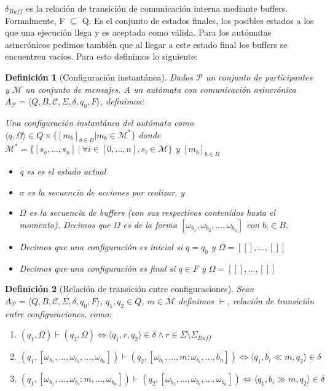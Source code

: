 \documentclass[paper=a4, fontsize=11pt, spanish]{scrartcl} %
\numberwithin{equation}{section} %
\numberwithin{figure}{section} %
\numberwithin{table}{section} %
\newtheorem{definition}{Definición}
\begin{document}
$\delta_{Buff}$ es la relación de transición de comunicación interna mediante buffers.\\

Formalmente, F $\subseteq$ Q. Es el conjunto de estados finales, los posibles estados a los que una ejecución llega y es aceptada como válida. Para los autómatas asincrónicos pedimos también que al llegar a este estado final los buffers se encuentren vacíos. Para esto definimos lo siguiente:

\begin{definition}[Configuración instantánea]
Dados $\mathcal{P}$ un conjunto de participantes y $\mathcal{M}$ un conjunto de mensajes. A un autómata con comunicación asincrónica $A_\mathcal{P} = \langle Q, B, \mathcal{C}, \Sigma, \delta, q_0, F\rangle$, definimos:

Una configuración instantánea del autómata como $\langle q, \Omega \rangle \in Q \times \{ [m_b]_{b \in B} | m_b \in \mathcal{M}^* \}$ donde $\mathcal{M}^* = \{ [s_o, \ldots, s_n] \  | \ \forall i \in [0, \ldots, n], s_i \in \mathcal{M} \}$ y $[m_b]_{b \in B} $

\begin{itemize}
\item  q es es el estado actual
\item $\sigma$ es la secuencia de acciones por realizar, y
\item $\Omega$ es la secuencia de buffers (con sus respectivos contenidos hasta el momento). Decimos que $\Omega$ es de la forma $[ \omega_{b_1}, \omega_{b_2},..., \omega_{b_n} ]$ con $b_i \in B$. 
\item Decimos que una configuración es inicial si $q = q_0$ y $ \Omega = [ [], \ldots, [] ]$
\item Decimos que una configuración es final si $q \in F$ y $ \Omega = [ [], \ldots, [] ]$
\end{itemize}
\end{definition}

\begin{definition}[Relación de transición entre configuraciones] Sean $A_\mathcal{P} = \langle Q, B, \mathcal{C}, \Sigma, \delta, q_0, F\rangle$, $q_1, q_2 \in Q$, $ m \in \mathcal{M}$ definimos $\vdash$, relación de transición entre configuraciones, como:  
\begin{enumerate}
\item $(q_1, \Omega) \vdash (q_2, \Omega) \iff \langle q_1,r, q_2 \rangle \in \delta \land r \in \Sigma \setminus \Sigma_\mathit{Buff}$

\item $(q_1 ,[\omega_{b_1},\ldots,\omega_{b_i},\ldots,\omega_{b_n}]) \vdash (q_2,[\omega_{b_1},\ldots,m : \omega_{b_i},\ldots,b_n]) \iff \langle q_1, b_i \ll m, q_2 \rangle  \in \delta $ 

\item $(q_1, [\omega_{b_1},\ldots,\omega_{b_i} : m,\ldots,\omega_{b_n}]) \vdash (q_2,[\omega_{b_1},\ldots,\omega_{b_i},\ldots,\omega_{b_n}]) \iff \langle q_1, b_i \gg m, q_2 \rangle \in \delta$
\end{enumerate}

\end{definition}
\end{document}
